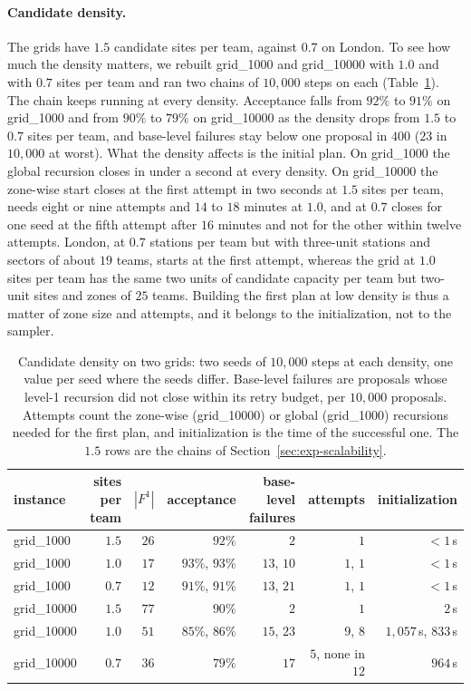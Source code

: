 \documentclass[11pt]{article}
\theoremstyle{definition}
\begin{document}
\paragraph{Candidate density.}
The grids have $1.5$ candidate sites per team, against $0.7$ on London. To see how much the density matters, we rebuilt grid\_1000 and grid\_10000 with $1.0$ and with $0.7$ sites per team and ran two chains of $10{,}000$ steps on each (Table~\ref{tab:density}). The chain keeps running at every density. Acceptance falls from $92\%$ to $91\%$ on grid\_1000 and from $90\%$ to $79\%$ on grid\_10000 as the density drops from $1.5$ to $0.7$ sites per team, and base-level failures stay below one proposal in $400$ ($23$ in $10{,}000$ at worst). What the density affects is the initial plan. On grid\_1000 the global recursion closes in under a second at every density. On grid\_10000 the zone-wise start closes at the first attempt in two seconds at $1.5$ sites per team, needs eight or nine attempts and $14$ to $18$ minutes at $1.0$, and at $0.7$ closes for one seed at the fifth attempt after $16$ minutes and not for the other within twelve attempts. London, at $0.7$ stations per team but with three-unit stations and sectors of about $19$ teams, starts at the first attempt, whereas the grid at $1.0$ sites per team has the same two units of candidate capacity per team but two-unit sites and zones of $25$ teams. Building the first plan at low density is thus a matter of zone size and attempts, and it belongs to the initialization, not to the sampler.

\begin{table}[!htbp]
\centering
\small
\begin{tabular}{lrrrrrr}
\toprule
instance & sites per team & $|F^1|$ & acceptance & base-level failures & attempts & initialization \\
\midrule
grid\_1000  & $1.5$ & $26$ & $92\%$ & $2$ & $1$ & $<1$\,s \\
grid\_1000  & $1.0$ & $17$ & $93\%$, $93\%$ & $13$, $10$ & $1$, $1$ & $<1$\,s \\
grid\_1000  & $0.7$ & $12$ & $91\%$, $91\%$ & $13$, $21$ & $1$, $1$ & $<1$\,s \\
grid\_10000 & $1.5$ & $77$ & $90\%$ & $2$ & $1$ & $2$\,s \\
grid\_10000 & $1.0$ & $51$ & $85\%$, $86\%$ & $15$, $23$ & $9$, $8$ & $1{,}057$\,s, $833$\,s \\
grid\_10000 & $0.7$ & $36$ & $79\%$ & $17$ & $5$, none in $12$ & $964$\,s \\
\bottomrule
\end{tabular}
\caption{Candidate density on two grids: two seeds of $10{,}000$ steps at each density, one value per seed where the seeds differ. Base-level failures are proposals whose level-1 recursion did not close within its retry budget, per $10{,}000$ proposals. Attempts count the zone-wise (grid\_10000) or global (grid\_1000) recursions needed for the first plan, and initialization is the time of the successful one. The $1.5$ rows are the chains of Section~\ref{sec:exp-scalability}.}
\label{tab:density}
\end{table}
\end{document}
